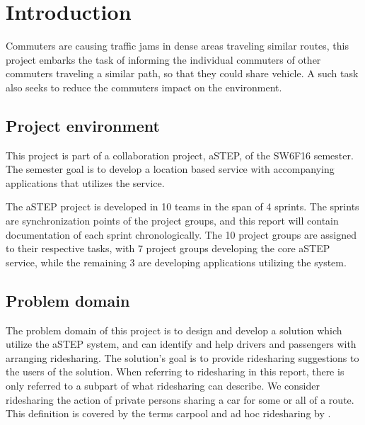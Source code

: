 \chapter{Introduction}\label{ch:introduction}


Commuters are causing traffic jams in dense areas traveling similar routes, this project embarks the task of informing the individual commuters of other commuters traveling a similar path, so that they could share vehicle.
A such task also seeks to reduce the commuters impact on the environment.


\section{Project environment}
This project is part of a collaboration project, aSTEP, of the SW6F16 semester.
The semester goal is to develop a location based service with accompanying applications that utilizes the service. 

The aSTEP project is developed in 10 teams in the span of 4 sprints.
The sprints are synchronization points of the project groups, and this report will contain documentation of each sprint chronologically.
The 10 project groups are assigned to their respective tasks, with 7 project groups developing the core aSTEP service, while the remaining 3 are developing applications utilizing the system.


\section{Problem domain}
The problem domain of this project is to design and develop a solution which utilize the aSTEP system, and can identify and help drivers and passengers with arranging ridesharing.
The solution's goal is to provide ridesharing suggestions to the users of the solution.
When referring to ridesharing in this report, there is only referred to a subpart of what ridesharing can describe.
We consider ridesharing the action of private persons sharing a car for some or all of a route. 
This definition is covered by the terms carpool and ad hoc ridesharing by \citet{doi:10.1080/01441647.2011.621557}.  


